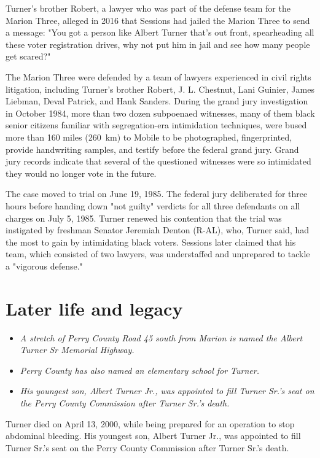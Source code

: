 Turner's brother Robert, a lawyer who was part of the defense team for
the Marion Three, alleged in 2016 that Sessions had jailed the Marion
Three to send a message: "You got a person like Albert Turner that's out
front, spearheading all these voter registration drives, why not put him
in jail and see how many people get scared?"

The Marion Three were defended by a team of lawyers experienced in civil
rights litigation, including Turner's brother Robert, J. L. Chestnut,
Lani Guinier, James Liebman, Deval Patrick, and Hank Sanders. During the
grand jury investigation in October 1984, more than two dozen subpoenaed
witnesses, many of them black senior citizens familiar with
segregation-era intimidation techniques, were bused more than 160 miles
(260~km) to Mobile to be photographed, fingerprinted, provide
handwriting samples, and testify before the federal grand jury. Grand
jury records indicate that several of the questioned witnesses were so
intimidated they would no longer vote in the future.

The case moved to trial on June 19, 1985. The federal jury deliberated
for three hours before handing down "not guilty" verdicts for all three
defendants on all charges on July 5, 1985. Turner renewed his contention
that the trial was instigated by freshman Senator Jeremiah Denton
(R-AL), who, Turner said, had the most to gain by intimidating black
voters. Sessions later claimed that his team, which consisted of two
lawyers, was understaffed and unprepared to tackle a "vigorous defense."

\section{Later life and legacy}\label{later-life-and-legacy}

\begin{itemize}
\item
  \emph{A stretch of Perry County Road 45 south from Marion is named the
  Albert Turner Sr Memorial Highway.}
\item
  \emph{Perry County has also named an elementary school for Turner.}
\item
  \emph{His youngest son, Albert Turner Jr., was appointed to fill
  Turner Sr.'s seat on the Perry County Commission after Turner Sr.'s
  death.}
\end{itemize}

Turner died on April 13, 2000, while being prepared for an operation to
stop abdominal bleeding. His youngest son, Albert Turner Jr., was
appointed to fill Turner Sr.'s seat on the Perry County Commission after
Turner Sr.'s death.

